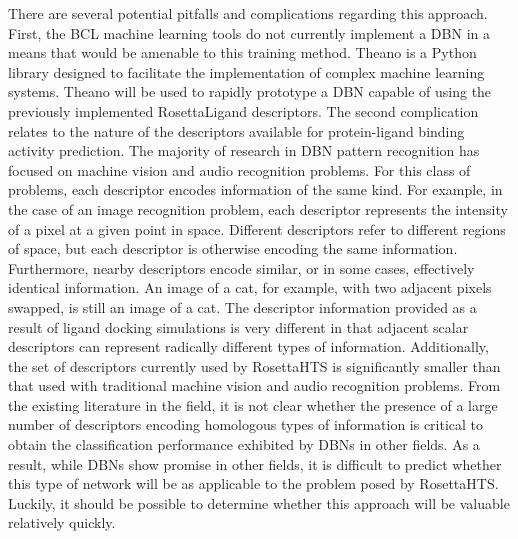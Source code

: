 There are several potential pitfalls and complications regarding this approach.
First, the \ac{BCL} machine learning tools do not currently implement a \ac{DBN} in a means that would be amenable to this training method.
Theano \citep{Bergstra:2010tc} is a Python library designed to facilitate the implementation of complex machine learning systems.
Theano will be used to rapidly prototype a \ac{DBN} capable of using the previously implemented RosettaLigand descriptors.
The second complication relates to the nature of the descriptors available for protein-ligand binding activity prediction.
The majority of research in \ac{DBN} pattern recognition has focused on machine vision and audio recognition problems.
For this class of problems, each descriptor encodes information of the same kind.
For example, in the case of an image recognition problem, each descriptor represents the intensity of a pixel at a given point in space.
Different descriptors refer to different regions of space, but each descriptor is otherwise encoding the same information.
Furthermore, nearby descriptors encode similar, or in some cases, effectively identical information.
An image of a cat, for example, with two adjacent pixels swapped, is still an image of a cat.
The descriptor information provided as a result of ligand docking simulations is very different in that adjacent scalar descriptors can represent radically different types of information.
Additionally, the set of descriptors currently used by RosettaHTS is significantly smaller than that used with traditional machine vision and audio recognition problems.
From the existing literature in the field, it is not clear whether the presence of a large number of descriptors encoding homologous types of information is critical to obtain the classification performance exhibited by \ac{DBN}s in other fields.
As a result, while \ac{DBN}s show promise in other fields, it is difficult to predict whether this type of network will be as applicable to the problem posed by RosettaHTS.
Luckily, it should be possible to determine whether this approach will be valuable relatively quickly.
